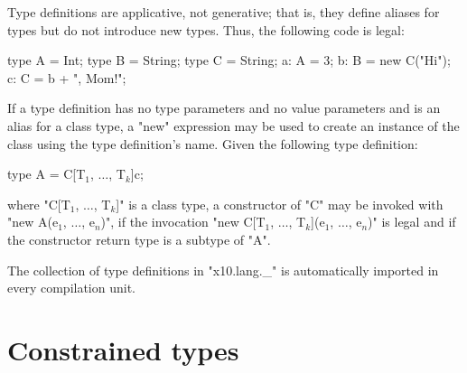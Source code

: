 Type definitions are applicative, not generative; that is, they
define aliases for types but do not introduce new types.
Thus, the following code is legal:
\begin{xten}
type A = Int;
type B = String;
type C = String;
a: A = 3;
b: B = new C("Hi");
c: C = b + ", Mom!";
\end{xten}
If a type definition has no type parameters and no value
parameters and is an alias for a class type, a \xcd"new"
expression may be used to create an instance of the class using
the type definition's name.
Given the following type definition:
\begin{xtenmath}
type A = C[T$_1$, $\dots$, T$_k$]{c};
\end{xtenmath}
where 
\xcdmath"C[T$_1$, $\dots$, T$_k$]" is a
class type, a constructor of \xcdmath"C" may be invoked with
\xcdmath"new A(e$_1$, $\dots$, e$_n$)", if the
invocation
\xcdmath"new C[T$_1$, $\dots$, T$_k$](e$_1$, $\dots$, e$_n$)" is
legal and if the constructor return type is a subtype of
\xcd"A".

The collection of type definitions in
\xcdmath"x10.lang._" is automatically imported in every compilation unit.
\label{X10LangUnderscore}







\section{Constrained types}
\label{ConstrainedTypes}
\label{DepType:DepType}
\label{DepTypes}

